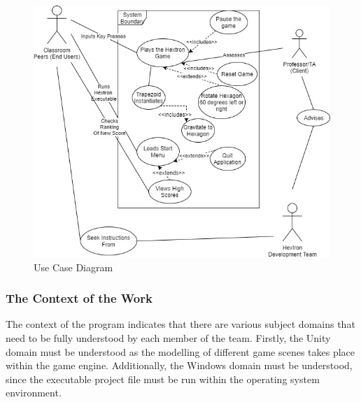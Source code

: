 \documentclass[12pt, titlepage]{article}
\begin{document}
\begin{figure}[H]
\centering
\includegraphics[width=12cm]{HextronUseCase}
\caption{Use Case Diagram}
\end{figure}

\subsubsection{The Context of the Work}
The context of the program indicates that there are various subject domains that need to be fully understood by each member of the team. Firstly, the Unity domain must be understood as the modelling of different game scenes takes place within the game engine. Additionally, the Windows domain must be understood, since the executable project file must be run within the operating system environment.
\end{document}
